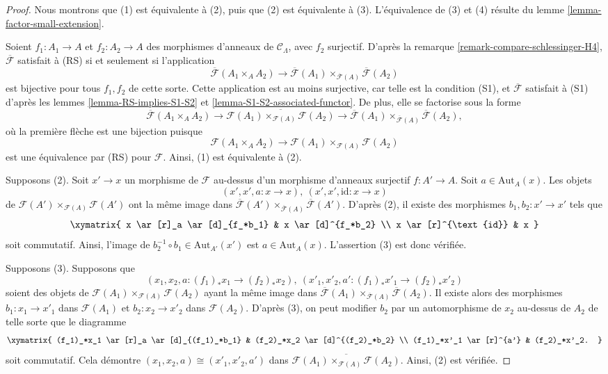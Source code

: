 \begin{proof}
Nous montrons que (1) est équivalente à (2), puis que (2) est équivalente à
(3). L'équivalence de (3) et (4) résulte du lemme
\ref{lemma-factor-small-extension}.

\medskip\noindent
Soient $f_1: A_1 \to A$ et $f_2: A_2 \to A$ des morphismes d'anneaux de
$\mathcal{C}_\Lambda$, avec $f_2$ surjectif. D'après la remarque
\ref{remark-compare-schlessinger-H4}, $\overline{\mathcal{F}}$ satisfait à
(RS) si et seulement si l'application
$$
\overline{\mathcal{F}}(A_1 \times_A A_2) \to \overline{\mathcal
F}(A_1) \times_{\overline{\mathcal{F}}(A)} \overline{\mathcal{F}}(A_2)
$$
est bijective pour tous $f_1, f_2$ de cette sorte. Cette application est au
moins surjective, car telle est la condition (S1), et
$\overline{\mathcal{F}}$ satisfait à (S1) d'après les lemmes
\ref{lemma-RS-implies-S1-S2} et \ref{lemma-S1-S2-associated-functor}. De plus,
elle se factorise sous la forme
$$
\overline{\mathcal{F}}(A_1 \times_A A_2)
\longrightarrow
\overline{\mathcal{F}(A_1) \times_{\mathcal{F}(A)} \mathcal{F}(A_2)}
\longrightarrow
\overline{\mathcal{F}}(A_1) \times_{\overline{\mathcal{F}}(A)}
\overline{\mathcal{F}}(A_2),
$$
où la première flèche est une bijection puisque
$$
\mathcal{F}(A_1 \times_A A_2)
\longrightarrow
\mathcal{F}(A_1) \times_{\mathcal{F}(A)} \mathcal{F}(A_2)
$$
est une équivalence par (RS) pour $\mathcal{F}$. Ainsi, (1) est équivalente à
(2).

\medskip\noindent
Supposons (2). Soit $x' \to x$ un morphisme de $\mathcal{F}$ au-dessus d'un
morphisme d'anneaux surjectif $f: A' \to A$. Soit
$a \in \text{Aut}_A(x)$. Les objets
$$
(x', x', a : x \to x), \ (x', x', \text{id} : x \to x)
$$
de
$\mathcal{F}(A') \times_{\mathcal{F}(A)} \mathcal{F}(A')$
ont la même image dans
$\overline{\mathcal{F}}(A') \times_{\overline{\mathcal{F}}(A)}
\overline{\mathcal{F}}(A')$. D'après (2), il existe des morphismes
$b_1, b_2 : x' \to x'$ tels que
$$
\xymatrix{
x \ar[r]_a \ar[d]_{f_*b_1} & x \ar[d]^{f_*b_2} \\
x \ar[r]^{\text{id}} & x
}
$$
soit commutatif. Ainsi, l'image de
$b_2^{-1} \circ b_1 \in \text{Aut}_{A'}(x')$ est
$a \in \text{Aut}_A(x)$. L'assertion (3) est donc vérifiée.

\medskip\noindent
Supposons (3). Supposons que
$$
(x_1, x_2, a : (f_1)_*x_1 \to (f_2)_*x_2),
\ (x'_1, x'_2, a' : (f_1)_*x'_1 \to (f_2)_*x'_2)
$$
soient des objets de
$\mathcal{F}(A_1) \times_{\mathcal{F}(A)} \mathcal{F}(A_2)$
ayant la même image dans
$\overline{\mathcal{F}}(A_1) \times_{\overline{\mathcal{F}}(A)}
\overline{\mathcal{F}}(A_2)$. Il existe alors des morphismes $b_1: x_1 \to
x'_1$ dans $\mathcal{F}(A_1)$ et $b_2: x_2 \to x'_2$ dans $\mathcal
F(A_2)$. D'après (3), on peut modifier $b_2$ par un automorphisme de $x_2$
au-dessus de $A_2$ de telle sorte que le diagramme
$$
\xymatrix{
(f_1)_*x_1 \ar[r]_a \ar[d]_{(f_1)_*b_1} & (f_2)_*x_2 \ar[d]^{(f_2)_*b_2} \\
(f_1)_*x'_1 \ar[r]^{a'} & (f_2)_*x'_2.
}
$$
soit commutatif. Cela démontre $(x_1, x_2, a) \cong (x'_1, x'_2, a')$ dans
$\overline{\mathcal{F}(A_1) \times_{\mathcal{F}(A)} \mathcal{F}(A_2)}$.
Ainsi, (2) est vérifiée.
\end{proof}

